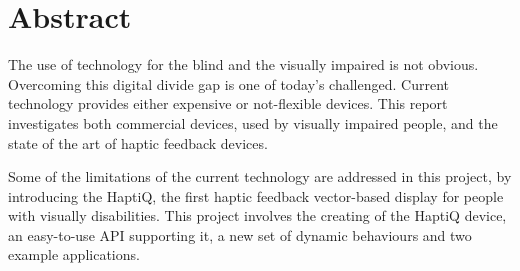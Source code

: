 \section{Abstract}

The use of technology for the blind and the visually impaired is not obvious. Overcoming this digital divide gap is one of today's challenged. Current technology provides either expensive or not-flexible devices. 
This report investigates both commercial devices, used by visually impaired people, and the state of the art of haptic feedback devices. 

Some of the limitations of the current technology are addressed in this project, by introducing the HaptiQ, the first haptic feedback vector-based display for people with visually disabilities. This project involves the creating of the HaptiQ device, an easy-to-use API supporting it, a new set of dynamic behaviours and two example applications. 

